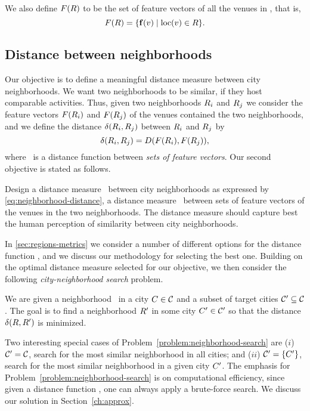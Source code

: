 We also define ${F}({R})$ to be the set of feature vectors of
all the venues in \region, that is, 
\begin{equation*}
 {F}({R}) = \{ {\mathbf{f}}({v}) \mid {\mathrm{loc}}({v})\in{R} \}.  
\end{equation*}


\subsection{Distance between neighborhoods}
Our objective is to define a meaningful distance measure between city
neighborhoods.
We want two neighborhoods to be similar, 
if they host comparable activities.
Thus, given two neighborhoods ${R}_i$ and ${R}_j$ 
we consider the feature vectors ${F}({R}_i)$ and
${F}({R}_j)$ of the venues contained the two neighborhoods, and 
we define the distance ${\delta}({R}_i,{R}_j)$ between
${R}_i$ and ${R}_j$ by
\begin{equation}
\label{eq:neighborhood-distance}
{\delta}({R}_i,{R}_j) = 
{D}({F}({R}_i),{F}({R}_j)),
\end{equation}
where \sdist\ is a distance function between 
{\em sets of feature vectors}. 
Our second objective is stated as follows.
\begin{objective}
\label{objective:neighborhood-distance-learning}
Design a distance measure \rdist\ between city neighborhoods as
expressed by \eqref{eq:neighborhood-distance},
\ie{} a distance measure \sdist\ between sets of feature vectors  of the
venues in the two neighborhoods. 
The distance measure should capture best the human
perception of similarity between city neighborhoods. 
\end{objective}
In \autoref{sec:regions-metrics}
we consider a number of different options for the distance function
\sdist, and we discuss our methodology for selecting the best one.
Building on the optimal distance measure selected for our objective, 
we then consider the following {\em city-neighborhood search} problem. 

\begin{problem}
\label{problem:neighborhood-search}
We are given a neighborhood \region\ in a city ${C}\in{\cal C}$
and a subset of target cities ${\cal C}'\subseteq{\cal C}$.
The goal is to find a neighborhood ${R}'$ in some city 
${C}'\in{\cal C}'$ so that the distance
${\delta}({R},{R}')$ is minimized. 
\end{problem}

Two interesting special cases of
Problem~\ref{problem:neighborhood-search} are
($i$)  ${\cal C}'={\cal C}$, 
search for the most similar neighborhood in all cities; 
and 
($ii$) ${\cal C}'=\{C'\}$, 
search for the most similar neighborhood in a given city ${C}'$.
The emphasis for Problem~\ref{problem:neighborhood-search} is on computational
efficiency, since given a distance function \rdist{}, one can always apply a
brute-force search.  We discuss our solution in Section~\ref{ch:approx}.

